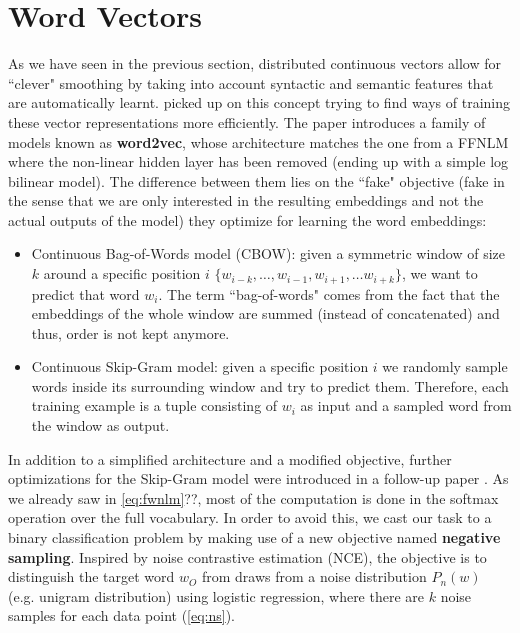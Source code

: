 
\section{Word Vectors}
\label{sec:wv}

As we have seen in the previous section, distributed continuous vectors allow for ``clever" smoothing by taking into account syntactic and semantic features that are automatically learnt. \cite{mikolov2013efficient} picked up on this concept trying to find ways of training these vector representations more efficiently. The paper introduces a family of models known as \textbf{word2vec}, whose architecture matches the one from a FFNLM where the non-linear hidden layer has been removed (ending up with a simple log bilinear model). The difference between them lies on the ``fake" objective (fake in the sense that we are only interested in the resulting embeddings and not the actual outputs of the model) they optimize for learning the word embeddings:

\begin{itemize}
	\item Continuous Bag-of-Words model (CBOW): given a symmetric window of size $k$ around a specific position $i$ $\{w_{i-k}, \ldots , w_{i-1}, w_{i+1}, \ldots w_{i+k}\}$, we want to predict that word $w_i$. The term ``bag-of-words" comes from the fact that the embeddings of the whole window are summed (instead of concatenated) and thus, order is not kept anymore.
	
	\item Continuous Skip-Gram model: given a specific position $i$ we randomly sample words inside its surrounding window and try to predict them. Therefore, each training example is a tuple consisting of $w_i$ as input and a sampled word from the window as output.
\end{itemize}

In addition to a simplified architecture and a modified objective, further optimizations for the Skip-Gram model were introduced in a follow-up paper \cite{mikolov2013distributed}. As we already saw in \autoref{eq:fwnlm}??, most of the computation is done in the softmax operation over the full vocabulary. In order to avoid this, we cast our task to a binary classification problem by making use of a new objective named \textbf{negative sampling}. Inspired by noise contrastive estimation (NCE), the objective is to distinguish the target word $w_O$ from draws from a noise distribution $P_n(w)$ (e.g. unigram distribution) using logistic regression, where there are $k$ noise samples for each data point (\autoref{eq:ns}).

